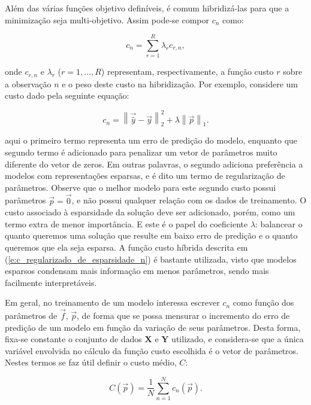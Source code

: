     Além das várias funções objetivo definíveis, é comum hibridizá-las para que a minimização seja multi-objetivo. Assim pode-se compor $c_n$ como:

    \begin{equation} \label{e:c_hibrida_n}
      c_n = \sum \limits_{r=1}^{R} \lambda_r c_{r,n}
      ,
    \end{equation}

    \noindent onde $c_{r,n}$ e $\lambda_r$ ($r=1,\ldots,R$) representam, respectivamente, a função custo $r$ sobre a observação $n$ e o peso deste custo na hibridização. Por exemplo, considere um custo dado pela seguinte equação:

    \begin{equation} \label{e:c_regularizado_de_esparsidade_n}
      c_n = \left\| \vec{\hat{y}} - \vec{y} \right\|_2^2 + \lambda \left\| \vec{p} \right\|_1
      .
    \end{equation}

    \noindent aqui o primeiro termo representa um erro de predição do modelo, enquanto que segundo termo é adicionado para penalizar um vetor de parâmetros muito diferente do vetor de zeros. Em outras palavras, o segundo adiciona preferência a modelos com representações esparsas, e é dito um termo de regularização de parâmetros. Observe que o melhor modelo para este segundo custo possui parâmetros $\vec{p} = \vec{0}$, e não possui qualquer relação com os dados de treinamento. O custo associado à esparsidade da solução deve ser adicionado, porém, como um termo extra de menor importância. E este é o papel do coeficiente $\lambda$: balancear o quanto queremos uma solução que resulte em baixo erro de predição e o quanto queremos que ela seja esparsa. A função custo híbrida descrita em (\ref{e:c_regularizado_de_esparsidade_n}) é bastante utilizada, visto que modelos esparsos condensam mais informação em menos parâmetros, sendo mais facilmente interpretáveis.

    Em geral, no treinamento de um modelo interessa escrever $c_n$ como função dos parâmetros de $\vec{f}$, $\vec{p}$, de forma que se possa mensurar o incremento do erro de predição de um modelo em função da variação de seus parâmetros. Desta forma, fixa-se constante o conjunto de dados $\boldsymbol{X}$ e $\boldsymbol{Y}$ utilizado, e considera-se que a única variável envolvida no cálculo da função custo escolhida é o vetor de parâmetros. Nestes termos se faz útil definir o custo médio, $C$:

    \begin{equation} \label{e:C}
      C(\vec{p}) = \frac{1}{N} \sum \limits_{n=1}^N c_n(\vec{p})
      .
    \end{equation}

